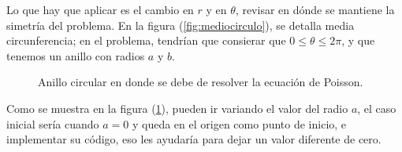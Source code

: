 \documentclass[letterpaper]{article}
\begin{document}
Lo que hay que aplicar es el cambio en $r$ y en $\theta$, revisar en dónde se mantiene la simetría del problema. En la figura (\ref{fig:mediocirculo}), se detalla media circunferencia; en el problema, tendrían que consierar que $0 \leq \theta \leq 2 \pi$, y que tenemos un anillo con radios $a$ y $b$.
\begin{figure}[H]
\begin{center}
\end{center}
\caption{Anillo circular en donde se debe de resolver la ecuación de Poisson.}
\label{fig:anillocircular}
\end{figure}
Como se muestra en la figura (\ref{fig:anillocircular}), pueden ir variando el valor del radio $a$, el caso inicial sería cuando $a=0$ y queda en el origen como punto de inicio, e implementar su código, eso les ayudaría para dejar un valor diferente de cero.
\end{document}
